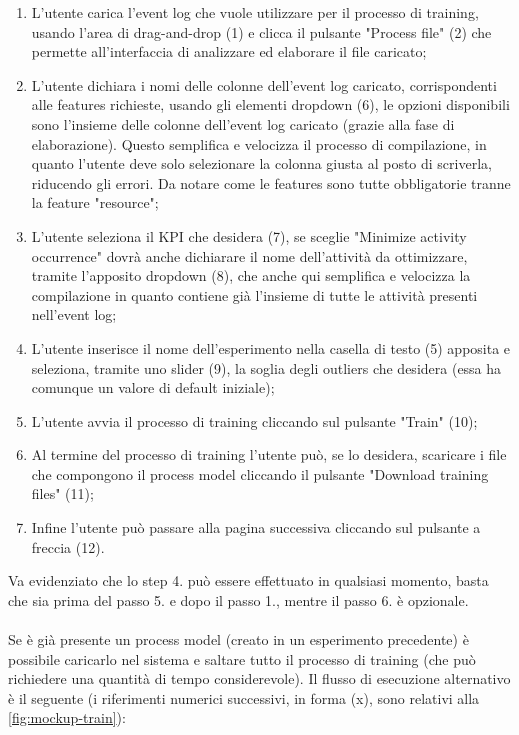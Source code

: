 \begin{enumerate}
\item L'utente carica l'event log che vuole utilizzare per il processo di training, usando l'area di \gls{drag-and-drop} (1) e clicca il pulsante "Process file" (2) che permette all'interfaccia di analizzare ed elaborare il file caricato;

\item L'utente dichiara i nomi delle colonne dell'event log caricato, corrispondenti alle features richieste, usando gli elementi \gls{dropdown} (6), le opzioni disponibili sono l'insieme delle colonne dell'event log caricato (grazie alla fase di elaborazione). Questo semplifica e velocizza il processo di compilazione, in quanto l'utente deve solo selezionare la colonna giusta al posto di scriverla, riducendo gli errori. Da notare come le features sono tutte obbligatorie tranne la feature "resource";

\item L'utente seleziona il KPI che desidera (7), se sceglie "Minimize activity occurrence" dovrà anche dichiarare il nome dell'attività da ottimizzare, tramite l'apposito \gls{dropdown} (8), che anche qui semplifica e velocizza la compilazione in quanto contiene già l'insieme di tutte le attività presenti nell'event log;

\item L'utente inserisce il nome dell'esperimento nella casella di testo (5) apposita e seleziona, tramite uno \gls{slider} (9), la soglia degli outliers che desidera (essa ha comunque un valore di default iniziale);

\item L'utente avvia il processo di training cliccando sul pulsante "Train" (10);

\item Al termine del processo di training l'utente può, se lo desidera, scaricare i file che compongono il process model cliccando il pulsante "Download training files" (11); 

\item Infine l'utente può passare alla pagina successiva cliccando sul pulsante a freccia (12).

\end{enumerate}

Va evidenziato che lo step 4. può essere effettuato in qualsiasi momento, basta che sia prima del passo 5. e dopo il passo 1., mentre il passo 6. è opzionale. 
\\ \\
Se è già presente un process model (creato in un esperimento precedente) è possibile caricarlo nel sistema e saltare tutto il processo di training (che può richiedere una quantità di tempo considerevole). Il flusso di esecuzione alternativo è il seguente (i riferimenti numerici successivi, in forma (x), sono relativi alla \autoref{fig:mockup-train}):


